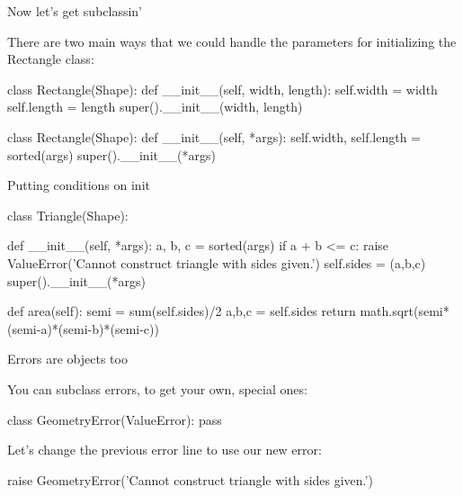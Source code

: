 \documentclass[aspectratio=149] {beamer}
\begin{document}
\begin{frame}[fragile]{Now let's get subclassin'}

There are two main ways that we could handle the parameters for initializing the Rectangle class:
\begin{pythoncode}
class Rectangle(Shape):
    def __init__(self, width, length):
        self.width = width
        self.length = length
        super().__init__(width, length)
\end{pythoncode}

\begin{pythoncode}
class Rectangle(Shape):
    def __init__(self, *args):
        self.width, self.length = sorted(args)
        super().__init__(*args)
\end{pythoncode}

\end{frame}


\begin{frame}[fragile]{Putting conditions on init}

  \begin{pythoncode}
    class Triangle(Shape):
    
        def __init__(self, *args):
            a, b, c = sorted(args)
            if a + b <= c:
                raise ValueError('Cannot construct triangle with sides given.')
            self.sides = (a,b,c)
            super().__init__(*args)
    
        def area(self):
            semi = sum(self.sides)/2
            a,b,c = self.sides
            return math.sqrt(semi*(semi-a)*(semi-b)*(semi-c))
    
  \end{pythoncode}

\end{frame}



\begin{frame}[fragile]{Errors are objects too}

  You can subclass errors, to get your own, special ones: \pause
  \begin{pythoncode}
    class GeometryError(ValueError):
        pass
  \end{pythoncode}
  
  \medskip \pause
  
  Let's change the previous error line to use our new error:
  
  \begin{smallpythoncode}
    raise GeometryError('Cannot construct triangle with sides given.')
  \end{smallpythoncode}
  



\end{frame}
\end{document}

